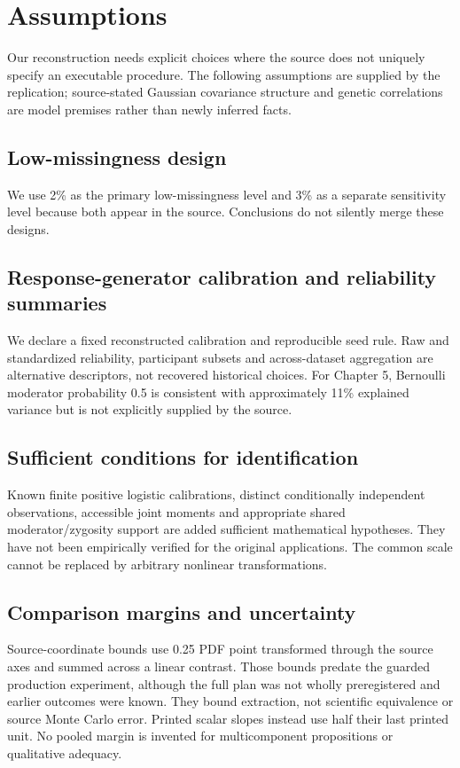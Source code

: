 \documentclass[11pt]{article}
\begin{document}
\section{Assumptions}\label{sec:assumptions}
Our reconstruction needs explicit choices where the source does not uniquely specify an executable procedure. The following assumptions are supplied by the replication; source-stated Gaussian covariance structure and genetic correlations are model premises rather than newly inferred facts.
\subsection{Low-missingness design}
We use 2\% as the primary low-missingness level and 3\% as a separate sensitivity level because both appear in the source. Conclusions do not silently merge these designs.
\subsection{Response-generator calibration and reliability summaries}
We declare a fixed reconstructed calibration and reproducible seed rule. Raw and standardized reliability, participant subsets and across-dataset aggregation are alternative descriptors, not recovered historical choices. For Chapter 5, Bernoulli moderator probability 0.5 is consistent with approximately 11\% explained variance but is not explicitly supplied by the source.
\subsection{Sufficient conditions for identification}
Known finite positive logistic calibrations, distinct conditionally independent observations, accessible joint moments and appropriate shared moderator/zygosity support are added sufficient mathematical hypotheses. They have not been empirically verified for the original applications. The common scale cannot be replaced by arbitrary nonlinear transformations.
\subsection{Comparison margins and uncertainty}
Source-coordinate bounds use 0.25 PDF point transformed through the source axes and summed across a linear contrast. Those bounds predate the guarded production experiment, although the full plan was not wholly preregistered and earlier outcomes were known. They bound extraction, not scientific equivalence or source Monte Carlo error. Printed scalar slopes instead use half their last printed unit. No pooled margin is invented for multicomponent propositions or qualitative adequacy.
\end{document}
